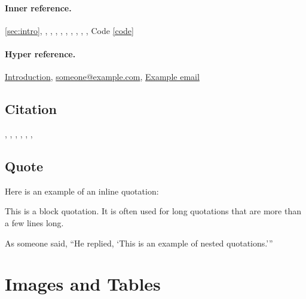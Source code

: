 \documentclass{article}
\begin{document}
\paragraph{Inner reference.}
\cref{sec:intro}, , , , , , , , , , Code \ref{code}

\paragraph{Hyper reference.}
\hyperref[sec:intro]{Introduction},
\href{mailto:someone@example.com}{someone@example.com},
\href{https://www.example.com}{Example email}

\subsection{Citation}
\cite{VaswaniSPUJGKP17},
\citep{VaswaniSPUJGKP17},
\citet{VaswaniSPUJGKP17},
\citealt{VaswaniSPUJGKP17}, \citealp{VaswaniSPUJGKP17},
\citealt*{VaswaniSPUJGKP17},
\citeauthor{VaswaniSPUJGKP17}


\subsection{Quote}
Here is an example of an inline quotation: 

\begin{displayquote}
This is a block quotation. It is often used for long quotations that are more than a few lines long.
\end{displayquote}

As someone said, \enquote{He replied, \enquote{This is an example of nested quotations.}}









\clearpage
\section{Images and Tables}
\end{document}
